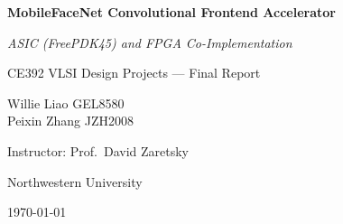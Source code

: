 \documentclass[11pt]{article}
\begin{document}
\begin{titlepage}
  \centering
  \vspace*{2.5cm}
  {\Huge\bfseries MobileFaceNet Convolutional Frontend Accelerator \par}
  \vspace{0.4cm}
  {\Large\itshape ASIC (FreePDK45) and FPGA Co-Implementation\par}
  \vspace{1.5cm}
  {\large CE392 VLSI Design Projects --- Final Report\par}
  \vspace{2.5cm}
  {\large
    Willie Liao \quad\textemdash\quad GEL8580 \\[4pt]
    Peixin Zhang \quad\textemdash\quad JZH2008 \\
  }
  \vfill
  {\large Instructor: Prof.\ David Zaretsky \par}
  \vspace{0.4cm}
  {\large Northwestern University \par}
  \vspace{0.4cm}
  {\large \today \par}
\end{titlepage}

\tableofcontents
\newpage
\listoffigures
\listoftables
\newpage
{}














% 
% 
\end{document}
